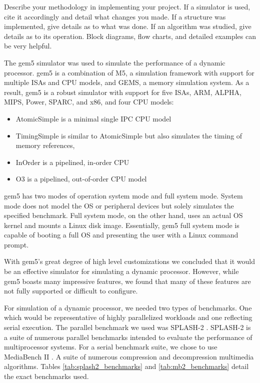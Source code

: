Describe your methodology in implementing your project. If a simulator is used,
cite it accordingly and detail what changes you made. If a structure was implemented, give details
as to what was done. If an algorithm was studied, give details as to its
operation. Block diagrams, flow charts, and detailed examples can be very helpful. 

The gem5 \cite{gem5} simulator was used to simulate the performance of a dynamic processor. gem5 is a combination of M5, a simulation framework with support for multiple ISAs and CPU models, and GEMS, a memory simulation system. As a result, gem5 is a robust simulator with support for five ISAs, ARM, ALPHA, MIPS, Power, SPARC, and x86, and four CPU models:

\begin{itemize}
\item AtomicSimple is a minimal single IPC CPU model
\item TimingSimple is similar to AtomicSimple but also simulates the timing of memory references,
\item InOrder is a pipelined, in-order CPU
\item O3 is a pipelined, out-of-order CPU model
\end{itemize}

gem5 has two modes of operation system mode and full system mode. System mode does not model the OS or peripheral devices but solely simulates the specified benchmark. Full system mode, on the other hand, uses an actual OS kernel and mounts a Linux disk image. Essentially, gem5 full system mode is capable of booting a full OS and presenting the user with a Linux command prompt. 

With gem5's great degree of high level customizations we concluded that it would be an effective simulator for simulating a dynamic processor. However, while gem5 boasts many impressive features, we found that many of these features are not fully supported or difficult to configure.

For simulation of a dynamic processor, we needed two types of benchmarks. One which would be representative of highly parallelized workloads and one reflecting serial execution. The parallel benchmark we used was SPLASH-2 \cite{splash2}. SPLASH-2 is a suite of numerous parallel benchmarks intended to evaluate the performance of multiprocessor systems. For a serial benchmark suite, we chose to use MediaBench II \cite{mb2}. A suite of numerous compression and decompression multimedia algorithms. Tables \ref{tab:splash2_benchmarks} and \ref{tab:mb2_benchmarks} detail the exact benchmarks used.

